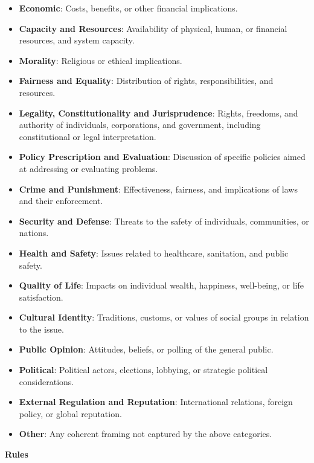 \documentclass[
10pt, %
a4paper, %
oneside, %
headinclude,footinclude, %
] {book}%
\begin{document}
\begin{tcolorbox}[
    colback=gray!5,
    colframe=black!75,
    title=Prompt Used for LLM Frame Annotation,
    sharp corners,
    boxrule=0.5pt
]
\begin{itemize}
    \item \textbf{Economic}: Costs, benefits, or other financial implications.
    \item \textbf{Capacity and Resources}: Availability of physical, human, or financial resources, and system capacity.
    \item \textbf{Morality}: Religious or ethical implications.
    \item \textbf{Fairness and Equality}: Distribution of rights, responsibilities, and resources.
    \item \textbf{Legality, Constitutionality and Jurisprudence}: Rights, freedoms, and authority of individuals, corporations, and government, including constitutional or legal interpretation.
    \item \textbf{Policy Prescription and Evaluation}: Discussion of specific policies aimed at addressing or evaluating problems.
    \item \textbf{Crime and Punishment}: Effectiveness, fairness, and implications of laws and their enforcement.
    \item \textbf{Security and Defense}: Threats to the safety of individuals, communities, or nations.
    \item \textbf{Health and Safety}: Issues related to healthcare, sanitation, and public safety.
    \item \textbf{Quality of Life}: Impacts on individual wealth, happiness, well-being, or life satisfaction.
    \item \textbf{Cultural Identity}: Traditions, customs, or values of social groups in relation to the issue.
    \item \textbf{Public Opinion}: Attitudes, beliefs, or polling of the general public.
    \item \textbf{Political}: Political actors, elections, lobbying, or strategic political considerations.
    \item \textbf{External Regulation and Reputation}: International relations, foreign policy, or global reputation.
    \item \textbf{Other}: Any coherent framing not captured by the above categories.
\end{itemize}

\vspace{0.5em}

\textbf{Rules}


\end{tcolorbox}
\end{document}
